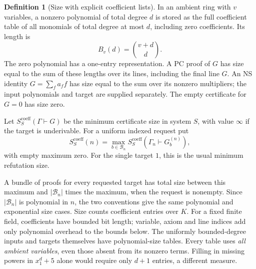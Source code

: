 \documentclass[11pt,a4paper]{article}
\theoremstyle{definition}\newtheorem{definition}[theorem]{Definition}
\theoremstyle{remark}\newtheorem{remark}[theorem]{Remark}
\begin{document}
\begin{definition}[Size with explicit coefficient lists]\label{def:dense-size}
In an ambient ring with $v$ variables, a nonzero polynomial of total
degree $d$ is stored as the full coefficient table of all monomials of
total degree at most $d$, including zero coefficients. Its length is
\[
                       B_v(d)=\binom{v+d}{d}.
\]
The zero polynomial has a one-entry representation. A PC proof of $G$
has size equal to the sum of these lengths over its lines, including
the final line $G$. An NS identity $G=\sum_fa_ff$ has size equal to
the sum over its nonzero multipliers; the input polynomials and target
are supplied separately. The empty certificate for $G=0$ has size zero.

Let $S^{\mathrm{coeff}}_S(\Gamma\vdash G)$ be the minimum certificate
size in system $S$, with value $\infty$ if the target is underivable.
For a uniform indexed request put
\[
 S^{\mathrm{coeff}}_S(n)=\max_{b\in\mathcal B_n}
                   S^{\mathrm{coeff}}_S(\Gamma_n\vdash G_b^{(n)}),
\]
with empty maximum zero. For the single target $1$, this is the usual
minimum refutation size.
\end{definition}

A bundle of proofs for every requested target has total size between
this maximum and $|\mathcal B_n|$ times the maximum, when the request
is nonempty. Since $|\mathcal B_n|$ is polynomial in $n$, the two
conventions give the same polynomial and exponential size cases.
Size counts coefficient entries over $K$. For a fixed finite field,
coefficients have bounded bit length; variable, axiom and line indices
add only polynomial overhead to the bounds below. The uniformly
bounded-degree inputs and targets themselves have polynomial-size
tables. Every table uses \emph{all ambient variables}, even those
absent from its nonzero terms. Filling in missing powers in
$x_1^d+5$ alone would require only $d+1$ entries, a different measure.
\end{document}
